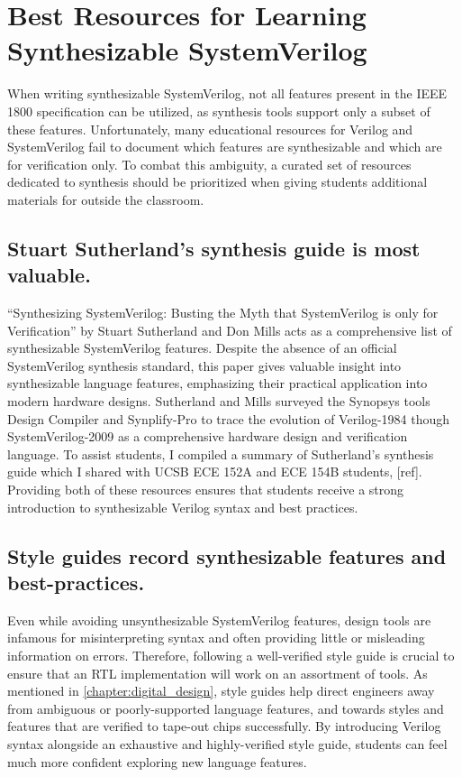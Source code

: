 
\chapter{Best Resources for Learning Synthesizable SystemVerilog}
\label{chapter:resources}

When writing synthesizable SystemVerilog, not all features present in the IEEE 1800 specification can be utilized, as synthesis tools support only a subset of these features. Unfortunately, many educational resources for Verilog and SystemVerilog fail to document which features are synthesizable and which are for verification only. To combat this ambiguity, a curated set of resources dedicated to synthesis should be prioritized when giving students additional materials for outside the classroom.

\section{Stuart Sutherland's synthesis guide is most valuable.}

``Synthesizing SystemVerilog: Busting the Myth that SystemVerilog is only for Verification'' by Stuart Sutherland and Don Mills acts as a comprehensive list of synthesizable SystemVerilog features. Despite the absence of an official SystemVerilog synthesis standard, this paper gives valuable insight into synthesizable language features, emphasizing their practical application into modern hardware designs. Sutherland and Mills surveyed the Synopsys tools Design Compiler and Synplify-Pro to trace the evolution of Verilog-1984 though SystemVerilog-2009 as a comprehensive hardware design and verification language. To assist students, I compiled a summary of Sutherland's synthesis guide which I shared with UCSB ECE 152A and ECE 154B students, [ref]. Providing both of these resources ensures that students receive a strong introduction to synthesizable Verilog syntax and best practices.

\section{Style guides record synthesizable features and best-practices.}

Even while avoiding unsynthesizable SystemVerilog features, design tools are infamous for misinterpreting syntax and often providing little or misleading information on errors. Therefore, following a well-verified style guide is crucial to ensure that an RTL implementation will work on an assortment of tools. As mentioned in \autoref{chapter:digital_design}, style guides help direct engineers away from ambiguous or poorly-supported language features, and towards styles and features that are verified to tape-out chips successfully. By introducing Verilog syntax alongside an exhaustive and highly-verified style guide, students can feel much more confident exploring new language features.

